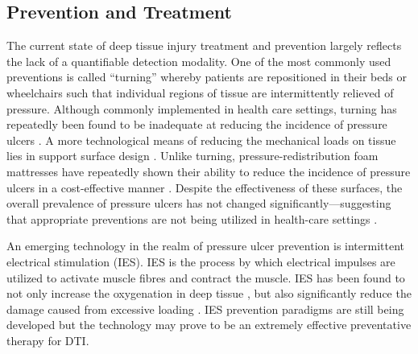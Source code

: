 
		\subsection{Prevention and Treatment}
			The current state of deep tissue injury treatment and prevention largely reflects the lack of a quantifiable detection modality. One of the most commonly used preventions is called ``turning'' whereby patients are repositioned in their beds or wheelchairs such that individual regions of tissue are intermittently relieved of pressure. Although commonly implemented in health care settings, turning has repeatedly been found to be inadequate at reducing the incidence of pressure ulcers \cite{vanderwee07,rich11}. A more technological means of reducing the mechanical loads on tissue lies in support surface design \cite{krouskop86}. Unlike turning, pressure-redistribution foam mattresses have repeatedly shown their ability to reduce the incidence of pressure ulcers in a cost-effective manner \cite{pham11,rafter11}. Despite the effectiveness of these surfaces, the overall prevalence of pressure ulcers has not changed significantly---suggesting that appropriate preventions are not being utilized in health-care settings \cite{maklebust05}.

			An emerging technology in the realm of pressure ulcer prevention is intermittent electrical stimulation (IES). IES is the process by which electrical impulses are utilized to activate muscle fibres and contract the muscle. IES has been found to not only increase the oxygenation in deep tissue \cite{gyawali11}, but also significantly reduce the damage caused from excessive loading \cite{solis13}. IES prevention paradigms are still being developed but the technology may prove to be an extremely effective preventative therapy for DTI.

